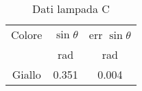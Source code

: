\begin{table}[H]
\begin{center}
\caption{Dati lampada C}
\begin{tabular}{|c|cc|}
\hline
Colore	&	$\sin \theta$	&	err $\sin \theta$	\\
	&	rad	&	rad	\\ \hline
Giallo	&	0.351	&	0.004	\\ \hline
\end{tabular}
\end{center}
\label{label}
\end{table}
